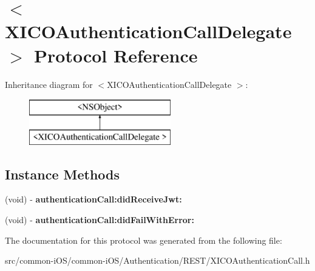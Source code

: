 \hypertarget{protocol_x_i_c_o_authentication_call_delegate_01-p}{}\section{$<$X\+I\+C\+O\+Authentication\+Call\+Delegate $>$ Protocol Reference}
\label{protocol_x_i_c_o_authentication_call_delegate_01-p}
Inheritance diagram for $<$X\+I\+C\+O\+Authentication\+Call\+Delegate $>$\+:\begin{figure}[H]
\begin{center}
\leavevmode
\includegraphics[height=2.000000cm]{protocol_x_i_c_o_authentication_call_delegate_01-p}
\end{center}
\end{figure}
\subsection*{Instance Methods}
\begin{DoxyCompactItemize}
\item 
\hypertarget{protocol_x_i_c_o_authentication_call_delegate_01-p_ab7b0e45bfec58c0f57cc7dc21c7748b6}{}\label{protocol_x_i_c_o_authentication_call_delegate_01-p_ab7b0e45bfec58c0f57cc7dc21c7748b6} 
(void) -\/ {\bfseries authentication\+Call\+:did\+Receive\+Jwt\+:}
\item 
\hypertarget{protocol_x_i_c_o_authentication_call_delegate_01-p_a32dd703c413d39680a1f72699cc19f89}{}\label{protocol_x_i_c_o_authentication_call_delegate_01-p_a32dd703c413d39680a1f72699cc19f89} 
(void) -\/ {\bfseries authentication\+Call\+:did\+Fail\+With\+Error\+:}
\end{DoxyCompactItemize}


The documentation for this protocol was generated from the following file\+:\begin{DoxyCompactItemize}
\item 
src/common-\/i\+O\+S/common-\/i\+O\+S/\+Authentication/\+R\+E\+S\+T/X\+I\+C\+O\+Authentication\+Call.\+h\end{DoxyCompactItemize}
